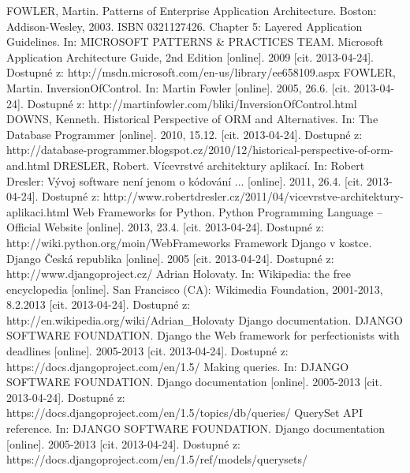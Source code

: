 \documentclass[ing,male,java,dept456]{diploma}						%
\begin{document}

\begin{thebibliography}{99}

 FOWLER, Martin. Patterns of Enterprise Application Architecture. Boston: Addison-Wesley, 2003. ISBN 0321127426.
 Chapter 5: Layered Application Guidelines. In: MICROSOFT PATTERNS \& PRACTICES TEAM. Microsoft Application Architecture Guide, 2nd Edition [online]. 2009 [cit. 2013-04-24]. Dostupné z: http://msdn.microsoft.com/en-us/library/ee658109.aspx
 FOWLER, Martin. InversionOfControl. In: Martin Fowler [online]. 2005, 26.6. [cit. 2013-04-24]. Dostupné z: http://martinfowler.com/bliki/InversionOfControl.html
 DOWNS, Kenneth. Historical Perspective of ORM and Alternatives. In: The Database Programmer [online]. 2010, 15.12. [cit. 2013-04-24]. Dostupné z: http://database-programmer.blogspot.cz/2010/12/historical-perspective-of-orm-and.html
 DRESLER, Robert. Vícevrstvé architektury aplikací. In: Robert Dresler: Vývoj software není jenom o kódování ... [online]. 2011, 26.4. [cit. 2013-04-24]. Dostupné z: http://www.robertdresler.cz/2011/04/vicevrstve-architektury-aplikaci.html
 Web Frameworks for Python. Python Programming Language – Official Website [online]. 2013, 23.4. [cit. 2013-04-24]. Dostupné z: http://wiki.python.org/moin/WebFrameworks
 Framework Django v kostce. Django Česká republika [online]. 2005 [cit. 2013-04-24]. Dostupné z: http://www.djangoproject.cz/
 Adrian Holovaty. In: Wikipedia: the free encyclopedia [online]. San Francisco (CA): Wikimedia Foundation, 2001-2013, 8.2.2013 [cit. 2013-04-24]. Dostupné z: http://en.wikipedia.org/wiki/Adrian\_Holovaty
 Django documentation. DJANGO SOFTWARE FOUNDATION. Django the Web framework for perfectionists with deadlines [online]. 2005-2013 [cit. 2013-04-24]. Dostupné z: https://docs.djangoproject.com/en/1.5/
 Making queries. In: DJANGO SOFTWARE FOUNDATION. Django documentation [online]. 2005-2013 [cit. 2013-04-24]. Dostupné z: https://docs.djangoproject.com/en/1.5/topics/db/queries/
 QuerySet API reference. In: DJANGO SOFTWARE FOUNDATION. Django documentation [online]. 2005-2013 [cit. 2013-04-24]. Dostupné z: https://docs.djangoproject.com/en/1.5/ref/models/querysets/

\end{thebibliography}
\end{document}
